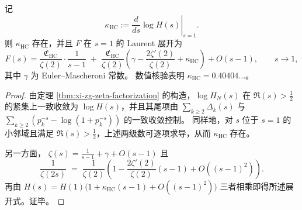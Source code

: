 \begin{proposition}[\texorpdfstring{$s=1$}{s=1} 的 Laurent 展开与 Euler--Kronecker 型常数]\label{prop:xi-zg-hardcore-laurent}
记
\[
\kappa_{\mathrm{HC}}:=\left.\frac{d}{ds}\log H(s)\right|_{s=1}.
\]
则 \(\kappa_{\mathrm{HC}}\) 存在，并且 \(F\) 在 \(s=1\) 的 Laurent 展开为
\[
F(s)=\frac{\mathfrak C_{\mathrm{HC}}}{\zeta(2)}\cdot\frac{1}{s-1}
\;+\;
\frac{\mathfrak C_{\mathrm{HC}}}{\zeta(2)}
\left(\gamma-\frac{2\zeta'(2)}{\zeta(2)}+\kappa_{\mathrm{HC}}\right)
 + O(s-1),
\qquad s\to 1,
\]
其中 \(\gamma\) 为 Euler--Mascheroni 常数。
数值核验表明 \(\kappa_{\mathrm{HC}}=0.40404\ldots\)。
\end{proposition}

\begin{proof}
由定理 \ref{thm:xi-zg-zeta-factorization} 的构造，\(\log H_N(s)\) 在 \(\Re(s)>\tfrac12\) 的紧集上一致收敛为 \(\log H(s)\)，并且其尾项由 \(\sum_{k\ge 2}\Delta_k(s)\) 与 \(\sum_{k\ge 2}(p_k^{-s}-\log(1+p_k^{-s}))\) 的一致收敛控制。
同样地，对 \(s\) 位于 \(s=1\) 的小邻域且满足 \(\Re(s)>\tfrac12\)，上述两级数可逐项求导，从而 \(\kappa_{\mathrm{HC}}\) 存在。

另一方面，
\(
\zeta(s)=\frac1{s-1}+\gamma+O(s-1)
\)
且
\[
\frac{1}{\zeta(2s)}
\;=\;
\frac{1}{\zeta(2)}
\left(1-\frac{2\zeta'(2)}{\zeta(2)}(s-1)+O((s-1)^2)\right).
\]
再由
\(
H(s)=H(1)\bigl(1+\kappa_{\mathrm{HC}}(s-1)+O((s-1)^2)\bigr)
\)
三者相乘即得所述展开式。证毕。
\end{proof}



